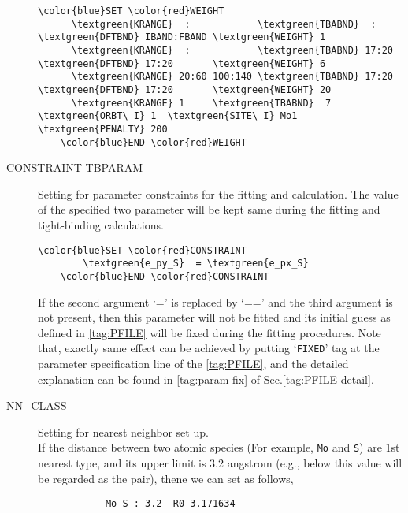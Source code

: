 \documentclass[a4paper,12pt]{scrartcl}
\makeatletter
\def\namedlabel#1#2{\begingroup
    #2%
    \def\@currentlabel{#2}%
    \phantomsection\label{#1}\endgroup
}
\newcommand{\textgreen}[1]{\textcolor{green!50!black}{\texttt{#1}}}
\makeatother
\begin{document}
\begin{description}
 \begin{Verbatim}[commandchars=\\\{\},gobble=4, frame=single, framesep=2mm, 
    label= WEIGHT setup example,
    labelposition=bottomline]
    \color{blue}SET \color{red}WEIGHT
      \textgreen{KRANGE}  :            \textgreen{TBABND}  :    \textgreen{DFTBND} IBAND:FBAND \textgreen{WEIGHT} 1
      \textgreen{KRANGE}  :            \textgreen{TBABND} 17:20 \textgreen{DFTBND} 17:20       \textgreen{WEIGHT} 6 
      \textgreen{KRANGE} 20:60 100:140 \textgreen{TBABND} 17:20 \textgreen{DFTBND} 17:20       \textgreen{WEIGHT} 20
      \textgreen{KRANGE} 1     \textgreen{TBABND}  7    \textgreen{ORBT\_I} 1  \textgreen{SITE\_I} Mo1 \textgreen{PENALTY} 200
    \color{blue}END \color{red}WEIGHT
 \end{Verbatim}


 	\item[\namedlabel{tag:CONSTRAINT}{CONSTRAINT TBPARAM}]
		Setting for parameter constraints for the fitting and calculation.
		The value of the specified two parameter will be kept same during the
		fitting and tight-binding calculations.

 \begin{Verbatim}[commandchars=\\\{\},gobble=4, frame=single, framesep=2mm, 
    label= CONSTRAINT setup example,
    labelposition=bottomline]
    \color{blue}SET \color{red}CONSTRAINT
        \textgreen{e_py_S}  = \textgreen{e_px_S} 
    \color{blue}END \color{red}CONSTRAINT
 \end{Verbatim}

		If the second argument `=' is replaced by `==' and the third argument
		is not present, then this parameter will not be fitted and its initial
		guess as defined in \ref{tag:PFILE} will be fixed during the fitting procedures.
		Note that, exactly same effect can be achieved by putting `\texttt{FIXED}' tag
		at the parameter specification line of the \ref{tag:PFILE}, and the detailed 
		explanation can be found in \ref{tag:param-fix} of Sec.\ref{tag:PFILE-detail}.

 	\item[\namedlabel{tag:NNCLASS}{NN\_CLASS}]
		Setting for nearest neighbor set up. \\
		If the distance between two atomic species (For example, \texttt{Mo} 
		and \texttt{S}) are 1st nearest type, and its upper limit is 3.2 
		angstrom (e.g., below this value will be regarded as the pair), thene
		we can set as follows,
        \begin{verbatim}
         	Mo-S : 3.2  R0 3.171634
        \end{verbatim}  


\end{description}
\end{document}
